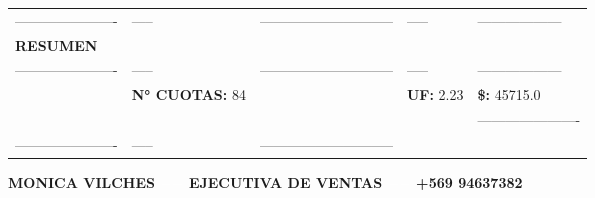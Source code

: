 \documentclass[10pt]{article}
\begin{document}
\begin{tabular}{lllll}
\hline
\color{white}----------------------& \color{white}----- & \color{white}----------------------------- & \color{white}-----  & \color{white}------------------ \\
\textbf{\Large RESUMEN} & & & &\\ 
\color{white}----------------------& \color{white}----- & \color{white}----------------------------- & \color{white}-----  & \color{white}------------------ \\
 & \textbf{N° CUOTAS: }84& &\textbf{UF: } 2.23 & \textbf{\$: } 45715.0 \\  
 & & & &\color{white}---------------------- \\
 \color{white}----------------------& \color{white}----- & \color{white}----------------------------- &\\

 \hline
 \end{tabular}
 \begin{center}
     \textbf{MONICA VILCHES  $\color{white}--$  EJECUTIVA DE VENTAS $\color{white}--$   +569 94637382}
 \end{center}
 
\end{document}
